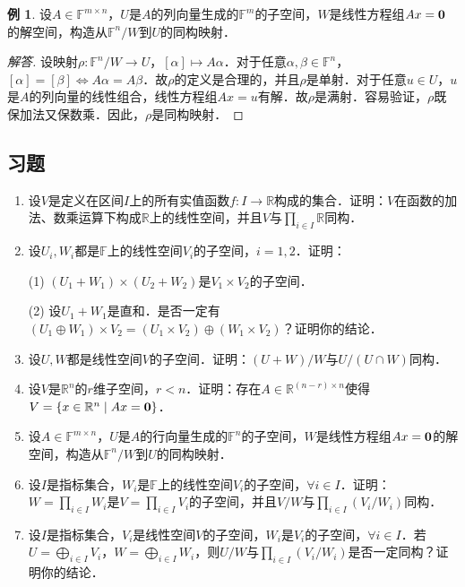\documentclass[a4paper,fontset=windows]{ctexbook}
\theoremstyle{definition}
\newtheorem{example}{例}[chapter]
\begin{document}
\begin{example}
设$A\in\mathbb{F}^{m\times n}$，$U$是$A$的列向量生成的$\mathbb{F}^m$的子空间，$W$是线性方程组$Ax={\bf 0}$的解空间，构造从$\mathbb{F}^n/W$到$U$的同构映射．
\end{example}

\begin{proof}[解答]
设映射$\rho:\mathbb{F}^n/W\to U$，$[\alpha]\mapsto A\alpha$．对于任意$\alpha,\beta\in\mathbb{F}^n$，$[\alpha]=[\beta]\Leftrightarrow A\alpha=A\beta$．故$\rho$的定义是合理的，并且$\rho$是单射．对于任意$u\in U$，$u$是$A$的列向量的线性组合，线性方程组$Ax=u$有解．故$\rho$是满射．容易验证，$\rho$既保加法又保数乘．因此，$\rho$是同构映射．
\end{proof}

\subsection*{习题}

\begin{enumerate}
\item 设$V$是定义在区间$I$上的所有实值函数$f:I\to\mathbb{R}$构成的集合．证明：$V$在函数的加法、数乘运算下构成$\mathbb{R}$上的线性空间，并且$V$与$\prod\limits_{i\in I}\mathbb{R}$同构．

\item 设$U_i,W_i$都是$\mathbb{F}$上的线性空间$V_i$的子空间，$i=1,2$．证明：

(1) $(U_1+W_1)\times(U_2+W_2)$是$V_1\times V_2$的子空间．

(2) 设$U_1+W_1$是直和．是否一定有$(U_1\oplus W_1)\times V_2=(U_1\times V_2)\oplus(W_1\times V_2)$？证明你的结论．

\item 设$U,W$都是线性空间$V$的子空间．证明：$(U+W)/W$与$U/(U\cap W)$同构．

\item 设$V$是$\mathbb{R}^n$的$r$维子空间，$r<n$．证明：存在$A\in\mathbb{R}^{(n-r)\times n}$使得$V=\{x\in\mathbb{R}^n\mid Ax={\bf 0}\}$．

\item 设$A\in\mathbb{F}^{m\times n}$，$U$是$A$的行向量生成的$\mathbb{F}^n$的子空间，$W$是线性方程组$Ax={\bf 0}$的解空间，构造从$\mathbb{F}^n/W$到$U$的同构映射．

\item 设$I$是指标集合，$W_i$是$\mathbb{F}$上的线性空间$V_i$的子空间，$\forall i\in I$．证明：$W=\prod\limits_{i\in I}W_i$是$V=\prod\limits_{i\in I}V_i$的子空间，并且$V/W$与$\prod\limits_{i\in I}(V_i/W_i)$同构．

\item 设$I$是指标集合，$V_i$是线性空间$V$的子空间，$W_i$是$V_i$的子空间，$\forall i\in I$．若$U=\bigoplus\limits_{i\in I}V_i$，$W=\bigoplus\limits_{i\in I}W_i$，则$U/W$与$\prod\limits_{i\in I}(V_i/W_i)$是否一定同构？证明你的结论．

\end{enumerate}
\end{document}
